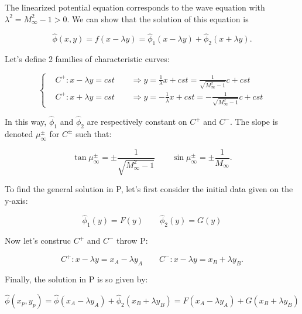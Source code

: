 	The linearized potential equation corresponds to the wave equation with $\lambda ^2 = M_\infty ^2 -1 >0$. We can show that the solution of this equation is 
	
	\begin{equation}
	\hat{\phi}(x,y)= f(x-\lambda y) = \hat{\phi} _{1}(x-\lambda y) + \hat{\phi} _{2} (x+\lambda y).
	\end{equation}		
	
	Let's define 2 families of characteristic curves:
	
	\begin{equation}
	\left\{
	\begin{aligned}
	&C^+ : x-\lambda y = cst \qquad \Rightarrow y = \frac{1}{\lambda} x + cst = \frac{1}{\sqrt{M_\infty ^2 -1}} c + cst\\
	&C^+ : x+\lambda y = cst \qquad \Rightarrow y = -\frac{1}{\lambda} x + cst = -\frac{1}{\sqrt{M_\infty ^2 -1}} c + cst
	\end{aligned}
	\right.
	\end{equation}
	
	In this way, $\hat{\phi} _1$ and $\hat{\phi} _2$ are respectively constant on $C^+$ and $C^-$. The slope is denoted $\mu _\infty ^\pm$ for $C^\pm$ such that: 
	
	\begin{equation}
	\tan \mu _\infty ^\pm = \pm \frac{1}{\sqrt{M_\infty ^2 -1}} \qquad \sin \mu _\infty ^\pm = \pm \frac{1}{M_\infty}.
	\end{equation}
	
	To find the general solution in P, let's first consider the initial data given on the y-axis: 
	
	\begin{equation}
	\hat{\phi} _1(y) = F(y)\qquad \hat{\phi}_2 (y) = G(y)
	\end{equation}
	
	Now let's construc $C^+$ and $C^-$ throw P: 
	
	\begin{equation}
	C^+ : x-\lambda y = x_A - \lambda y_A\qquad C^- : x-\lambda y = x_B + \lambda y_B.
	\end{equation}
	
	Finally, the solution in P is so given by:
	
	\begin{equation}
	\hat{ \phi} (x_p,y_p) = \hat{\phi} (x_A - \lambda y_A) + \hat{\phi} _2 (x_B + \lambda y_B) = F (x_A - \lambda y_A) + G (x_B + \lambda y_B)
	\end{equation}

